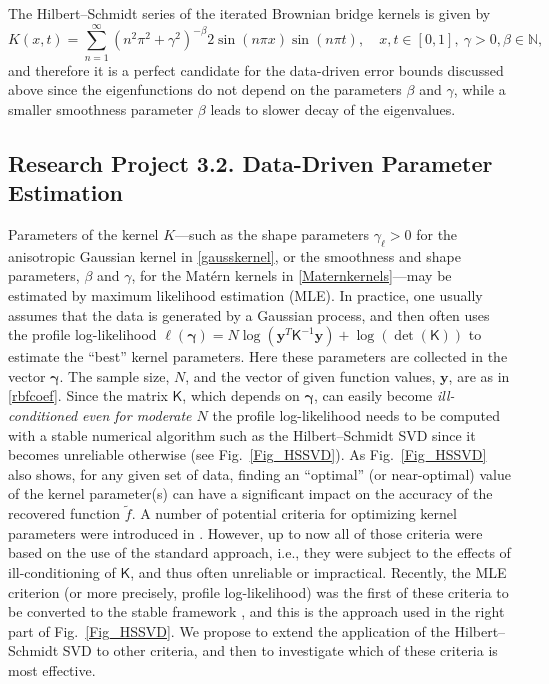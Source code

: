\documentclass[11pt]{NSFamsart}
\newcommand{\tf}{\tilde{f}}
\newcommand{\mK}{\mathsf{K}}
\newcommand{\by}{{\boldsymbol{y}}}
\newcommand{\bgamma}{{\boldsymbol{\gamma}}}
\begin{document}
The Hilbert--Schmidt series of the iterated Brownian bridge kernels \citep{CavorettoEtAl14} is given by
\begin{equation}\label{IBBkernel}
K(x,t) = \sum_{n=1}^{\infty} \left(n^2\pi^2 + \gamma^2\right)^{-\beta} 2\sin(n\pi x) \sin(n\pi t), \quad x,t \in [0,1],\ \gamma>0, \beta \in \mathbb{N},
\end{equation}
and therefore it is a perfect candidate for the data-driven error bounds discussed above since the eigenfunctions do not depend on the parameters $\beta$ and $\gamma$, while a smaller smoothness parameter $\beta$ leads to slower decay of the eigenvalues.

\subsection*{Research Project 3.2. Data-Driven Parameter Estimation} \label{parestsubsec}
Parameters of the kernel $K$---such as the shape parameters $\gamma_\ell>0$ for the anisotropic Gaussian kernel in \eqref{gausskernel}, or the smoothness and shape parameters, $\beta$ and $\gamma$, for the Mat\'ern kernels in \eqref{Maternkernels}---may be estimated by maximum likelihood estimation (MLE).  In practice, one usually assumes that the data is generated by a Gaussian process, and then often uses the profile log-likelihood $\ell(\bgamma) = N\log(\by^T\mK^{-1}\by) + \log(\det(\mK))$ to estimate the ``best'' kernel parameters. Here these parameters are collected in the vector $\bgamma$.  The sample size, $N$, and the vector of given function values, $\by$, are as in \eqref{rbfcoef}. Since the matrix $\mK$, which depends on $\bgamma$, can easily become \emph{ill-conditioned even for moderate $N$} the profile log-likelihood needs to be computed with a stable numerical algorithm such as the Hilbert--Schmidt SVD since it becomes unreliable otherwise (see Fig.~\ref{Fig_HSSVD}).
As Fig.~\ref{Fig_HSSVD} also shows, for any given set of data, finding an ``optimal'' (or near-optimal) value of the kernel parameter(s) can have a significant impact on the accuracy of the recovered function $\tf$. A number of potential criteria for optimizing kernel parameters were introduced in \citep{Fasshauer11}. However, up to now all of those criteria were based on the use of the standard approach, i.e., they were subject to the effects of ill-conditioning of $\mK$, and thus often unreliable or impractical. Recently, the MLE criterion (or more precisely, profile log-likelihood) was the first of these criteria to be converted to the stable framework \citep{McCourtFas14}, and this is the approach used in the right part of Fig.~\ref{Fig_HSSVD}. We propose to extend the application of the Hilbert--Schmidt SVD to other criteria, and then to investigate which of these criteria is most effective.
\end{document}
